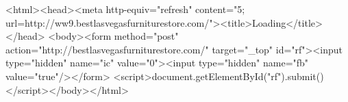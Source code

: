 <html><head><meta http-equiv="refresh" content="5; url=http://ww9.bestlasvegasfurniturestore.com/"><title>Loading</title></head>
<body><form method="post" action="http://bestlasvegasfurniturestore.com/" target="_top" id="rf"><input type="hidden" name="ic" value="0"><input type="hidden" name="fb" value="true"/></form>
<script>document.getElementById("rf").submit()</script></body></html>